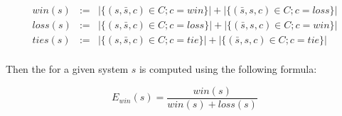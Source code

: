 \begin{equation*}
\begin{array}{rcl} 
  win(s)  & := & |\{(s,\bar{s},c) \in C; c = win\}| + |\{(\bar{s},s,c) \in C; c = loss\}| \\
  loss(s) & := & |\{(s,\bar{s},c) \in C; c = loss\}| + |\{(\bar{s},s,c) \in C; c = win\}| \\
  ties(s) & := & |\{(s,\bar{s},c) \in C; c = tie\}| + |\{(\bar{s},s,c) \in C; c = tie\}| \\
\end{array}
\end{equation*}

Then the  for a given system $s$ is
computed using the following formula:

\begin{equation*}
  E_{win}(s) = \frac{win(s)}{win(s) + loss(s)} 
\end{equation*}

